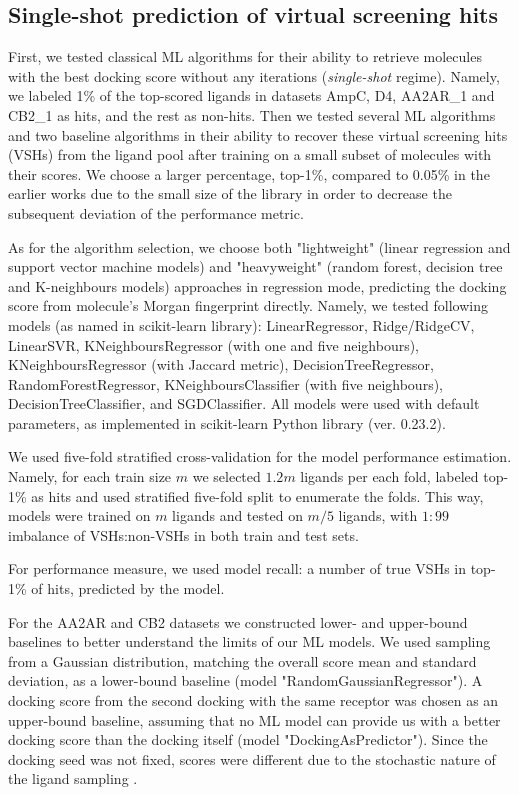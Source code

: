 \subsection{Single-shot prediction of virtual screening hits}
First, we tested classical ML algorithms for their ability to retrieve molecules with the best docking score without any iterations (\textit{single-shot} regime). Namely, we labeled 1\% of the top-scored ligands in datasets AmpC, D4, AA2AR\_1 and CB2\_1 as hits, and the rest as non-hits. Then we tested several ML algorithms and two baseline algorithms in their ability to recover these virtual screening hits (VSHs) from the ligand pool after training on a small subset of molecules with their scores. We choose a larger percentage, top-1\%, compared to 0.05\% in the earlier works  \cite{Graff2021AcceleratingLearning, logistic_regression, Yang2021_shoichet_active_learning} due to the small size of the library in order to decrease the subsequent deviation of the performance metric.

As for the algorithm selection, we choose both "lightweight" (linear regression and support vector machine models) and "heavyweight" (random forest, decision tree and K-neighbours models) approaches in regression mode, predicting the docking score from molecule's Morgan fingerprint directly. Namely, we tested following models (as named in scikit-learn library): LinearRegressor, Ridge/RidgeCV, LinearSVR, KNeighboursRegressor (with one and five neighbours), KNeighboursRegressor (with Jaccard metric), DecisionTreeRegressor, RandomForestRegressor, KNeighboursClassifier (with five neighbours), DecisionTreeClassifier, and SGDClassifier. All models were used with default parameters, as implemented in scikit-learn Python library \cite{scikit-learn} (ver. 0.23.2).

We used five-fold stratified cross-validation for the model performance estimation. Namely, for each train size $m$ we selected $1.2m$ ligands per each fold, labeled top-1\% as hits and used stratified five-fold split to enumerate the folds. This way, models were trained on $m$ ligands and tested on $m/5$ ligands, with $1:99$ imbalance of VSHs:non-VSHs in both train and test sets.

For performance measure, we used model recall: a number of true VSHs in top-1\% of hits, predicted by the model.

For the AA2AR and CB2 datasets we constructed lower- and upper-bound baselines to better understand the limits of our ML models. We used sampling from a Gaussian distribution, matching the overall score mean and standard deviation, as a lower-bound baseline (model "RandomGaussianRegressor"). A docking score from the second docking with the same receptor was chosen as an upper-bound baseline, assuming that no ML model can provide us with a better docking score than the docking itself (model "DockingAsPredictor"). Since the docking seed was not fixed, scores were different due to the stochastic nature of the ligand sampling \cite{abagyan_biased_1994}.

